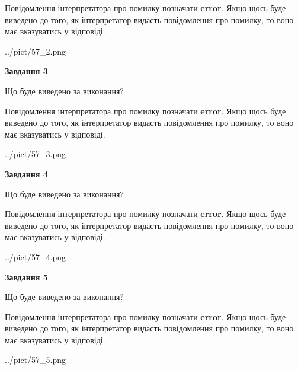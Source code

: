 \documentclass[12pt, ukrainian]{article}
\begin{document}
{\begin {large}
Повідомлення інтерпретатора про помилку позначати \textbf{error}.
Якщо щось буде виведено до того, як інтерпретатор видасть повідомлення про помилку, 
то воно має вказуватись у відповіді. \par


\begin{center}
	{../pict/57_2.png}
\end{center}
\newpage

{\begin {center}\textbf{Завдання 3}\end {center}}\par
Що буде виведено за виконання?

Повідомлення інтерпретатора про помилку позначати \textbf{error}.
Якщо щось буде виведено до того, як інтерпретатор видасть повідомлення про помилку, 
то воно має вказуватись у відповіді. \par


\begin{center}
	{../pict/57_3.png}
\end{center}
\newpage

{\begin {center}\textbf{Завдання 4}\end {center}}\par
Що буде виведено за виконання?

Повідомлення інтерпретатора про помилку позначати \textbf{error}.
Якщо щось буде виведено до того, як інтерпретатор видасть повідомлення про помилку, 
то воно має вказуватись у відповіді. \par


\begin{center}
	{../pict/57_4.png}
\end{center}
\newpage

{\begin {center}\textbf{Завдання 5}\end {center}}\par
Що буде виведено за виконання?

Повідомлення інтерпретатора про помилку позначати \textbf{error}.
Якщо щось буде виведено до того, як інтерпретатор видасть повідомлення про помилку, 
то воно має вказуватись у відповіді. \par


\begin{center}
	{../pict/57_5.png}
\end{center}
\newpage


\end{large}}
\end{document}
